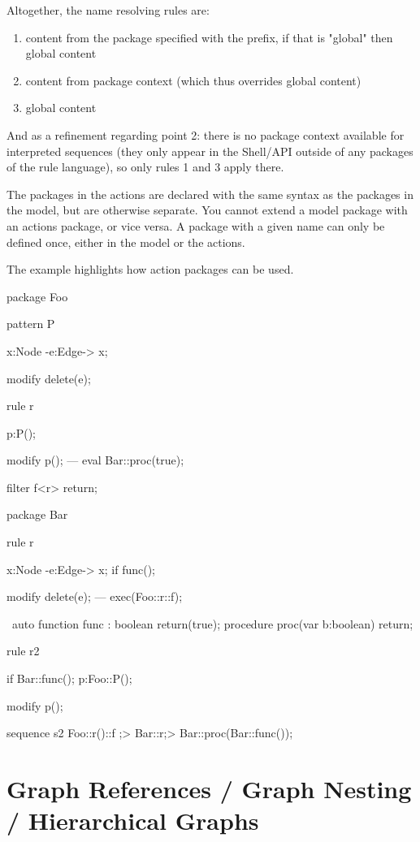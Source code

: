 Altogether, the name resolving rules are:
\begin{enumerate}
	\item content from the package specified with the prefix, if that is "global" then global content
	\item content from package context (which thus overrides global content)
	\item global content 
\end{enumerate}
And as a refinement regarding point 2: there is no package context available for interpreted sequences (they only appear in the Shell/API outside of any packages of the rule language), so only rules 1 and 3 apply there.

The packages in the actions are declared with the same syntax as the packages in the model, but are otherwise separate. 
You cannot extend a model package with an actions package, or vice versa.
A package with a given name can only be defined once, either in the model or the actions.

\begin{example}
The example highlights how action packages can be used.
	\begin{grgen}
package Foo {
	pattern P {
		x:Node -e:Edge-> x;

		modify {
			delete(e);
		}
	}
	rule r {
		p:P();

		modify {
			p();
		---
			eval { Bar::proc(true); }
		}
	}
	filter f<r> {
		return;
	}
}

package Bar {
	rule r {
		x:Node -e:Edge-> x;
		if{ func(); }

		modify {
			delete(e);
		---
			exec(Foo::r\Foo::f);
		}
	} \ auto
	function func : boolean {
		return(true);
	}
	procedure proc(var b:boolean) {
		return;
	}	
}

rule r2 {
	if{ Bar::func(); }
	p:Foo::P();
	
	modify {
		p();
	}
}

sequence s2 {
	Foo::r()\Foo::f ;> Bar::r\auto ;> { Bar::proc(Bar::func()); }
}
	\end{grgen}
\end{example}

\section{Graph References / Graph Nesting / Hierarchical Graphs}\label{sec:graphnesting}

